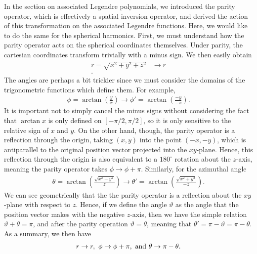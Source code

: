 In the section on associated Legendre polynomials, we introduced the parity operator, which is effectively a spatial inversion operator, and derived the action of this transformation on the associated Legendre functions.
Here, we would like to do the same for the spherical harmonics.
First, we must understand how the parity operator acts on the spherical coordinates themselves.
Under parity, the cartesian coordinates transform trivially with a minus sign.
We then easily obtain
\begin{align}
    r = \sqrt{x^2 + y^2 + z^2} &\rightarrow r \\
.\end{align}
The angles are perhaps a bit trickier since we must consider the domains of the trigonometric functions which define them.
For example,
\begin{eqnarray}
    \phi = \arctan(\frac{y}{x}) \rightarrow \phi' = \arctan(\frac{-y}{-x})
.\end{eqnarray}
It is important not to simply cancel the minus signs without considering the fact that $\arctan{x}$ is only defined on $[-\pi/2,\pi/2]$, so it is only sensitive to the relative sign of $x$ and $y$.
On the other hand, though, the parity operator is a reflection through the origin, taking $(x,y)$ into the point $(-x,-y)$, which is antiparallel to the original position vector projected into the $xy$-plane.
Hence, this reflection through the origin is also equivalent to a $180^{\circ}$ rotation about the $z$-axis, meaning the parity operator takes $\phi \rightarrow \phi + \pi$.
Similarly, for the azimuthal angle
\begin{eqnarray}
    \theta = \arctan(\frac{\sqrt{x^2 + y^2}}{z}) \rightarrow \theta' = \arctan(\frac{\sqrt{x^2 + y^2}}{-z})
.\end{eqnarray}
We can see geometrically that the the parity operator is a reflection about the $xy$-plane with respect to $z$.
Hence, if we define the angle $\vartheta$ as the angle that the position vector makes with the negative $z$-axis, then we have the simple relation $\vartheta + \theta = \pi$, and after the parity operation $\vartheta = \theta$, meaning that $\theta' = \pi - \vartheta = \pi - \theta$.
As a summary, we then have
\begin{eqnarray}
    r \rightarrow r,~ \phi \rightarrow \phi + \pi,~{\rm and}~\theta \rightarrow \pi - \theta
.\end{eqnarray}

